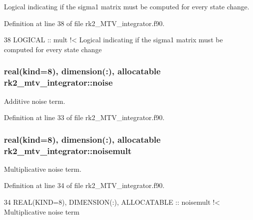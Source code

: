 Logical indicating if the sigma1 matrix must be computed for every state change. 



Definition at line 38 of file rk2\+\_\+\+M\+T\+V\+\_\+integrator.\+f90.


\begin{DoxyCode}
38   \textcolor{keywordtype}{LOGICAL} :: mult\textcolor{comment}{                                                 !< Logical indicating if the sigma1
       matrix must be computed for every state change}
\end{DoxyCode}
\subsubsection[{\texorpdfstring{noise}{noise}}]{\setlength{\rightskip}{0pt plus 5cm}real(kind=8), dimension(\+:), allocatable rk2\+\_\+mtv\+\_\+integrator\+::noise\hspace{0.3cm}{\ttfamily [private]}}\hypertarget{namespacerk2__mtv__integrator_a3171418fde58eb68937425899ecdc7af}{}\label{namespacerk2__mtv__integrator_a3171418fde58eb68937425899ecdc7af}


Additive noise term. 



Definition at line 33 of file rk2\+\_\+\+M\+T\+V\+\_\+integrator.\+f90.

\subsubsection[{\texorpdfstring{noisemult}{noisemult}}]{\setlength{\rightskip}{0pt plus 5cm}real(kind=8), dimension(\+:), allocatable rk2\+\_\+mtv\+\_\+integrator\+::noisemult\hspace{0.3cm}{\ttfamily [private]}}\hypertarget{namespacerk2__mtv__integrator_a950fc0519ed9785d8126a54cfe3ecce9}{}\label{namespacerk2__mtv__integrator_a950fc0519ed9785d8126a54cfe3ecce9}


Multiplicative noise term. 



Definition at line 34 of file rk2\+\_\+\+M\+T\+V\+\_\+integrator.\+f90.


\begin{DoxyCode}
34   \textcolor{keywordtype}{REAL(KIND=8)}, \textcolor{keywordtype}{DIMENSION(:)}, \textcolor{keywordtype}{ALLOCATABLE} :: noisemult\textcolor{comment}{            !< Multiplicative noise term}
\end{DoxyCode}
